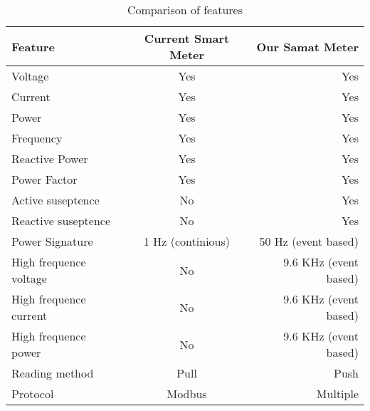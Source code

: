\begin{table}[htb]
	\centering
	\caption{Comparison of features}
	\begin{tabular}{@{}lcr@{}}
		Feature & Current Smart Meter & Our Samat Meter \\
	\midrule
		Voltage & Yes & Yes \\
		Current & Yes & Yes \\
		Power & Yes & Yes \\
		Frequency & Yes & Yes \\
		Reactive Power & Yes & Yes \\
		Power Factor & Yes & Yes \\
		Active suseptence & No & Yes \\
		Reactive suseptence & No & Yes \\
		Power Signature & 1 Hz (continious) & 50 Hz (event based) \\
		High frequence voltage & No & 9.6 KHz (event based) \\
		High frequence current & No & 9.6 KHz (event based) \\
		High frequence power & No & 9.6 KHz (event based) \\
		Reading method & Pull & Push \\
		Protocol & Modbus & Multiple \\
	\bottomrule
	\end{tabular}
	\label{tab:meterFeatures}
\end{table}
